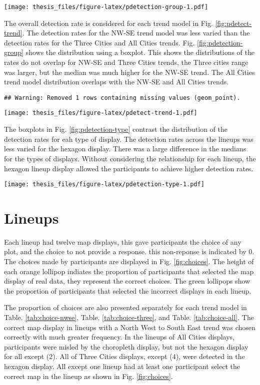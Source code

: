\documentclass{monashthesis}
\begin{document}
\texttt{[image: thesis\_files/figure-latex/pdetection-group-1.pdf]}

The overall detection rate is considered for each trend model in Fig. \ref{fig:pdetect-trend}.
The detection rates for the NW-SE trend model was less varied than the detection rates for the Three Cities and All Cities trends. Fig. \ref{fig:pdetection-group} shows the distribution using a boxplot. This shows the distributions of the rates do not overlap for NW-SE and Three Cities trends, the Three cities range was larger, but the median was much higher for the NW-SE trend. The All Cities trend model distribution overlaps with the NW-SE and All Cities trends.

\begin{verbatim}
## Warning: Removed 1 rows containing missing values (geom_point).
\end{verbatim}

\texttt{[image: thesis\_files/figure-latex/pdetect-trend-1.pdf]}

The boxplots in Fig. \ref{fig:pdetection-type} contrast the distribution of the detection rates for eah type of display.
The detection rates across the lineups was less varied for the hexagon display. There was a large difference in the medians for the types of displays.
Without considering the relationship for each lineup, the hexagon lineup display allowed the participants to achieve higher detection rates.

\texttt{[image: thesis\_files/figure-latex/pdetection-type-1.pdf]}

\hypertarget{lineups}{%
\section{Lineups}\label{lineups}}

Each lineup had twelve map displays, this gave participants the choice of any plot, and the choice to not provide a response. this non-reponse is indicated by 0.
The choices made by participants are displayed in Fig. \ref{fig:choices}. The height of each orange lollipop indiates the proportion of participants that selected the map display of real data, they represent the correct choices.
The green lollipops show the proportion of participants that selected the incorrect displays in each lineup.

The proportion of choices are also presented separately for each trend model in Table. \ref{tab:choice-nwse}, Table. \ref{tab:choice-three}, and Table. \ref{tab:choice-all}.
The correct map display in lineups with a North West to South East trend was chosen correctly with much greater frequency.
In the lineups of All Cities displays, participants were misled by the choropleth display, but not the hexagon display for all except (2).
All of Three Cities displays, except (4), were detected in the hexagon display. All except one lineup had at least one participant select the correct map in the lineup as shown in Fig. \ref{fig:choices}.
\end{document}
